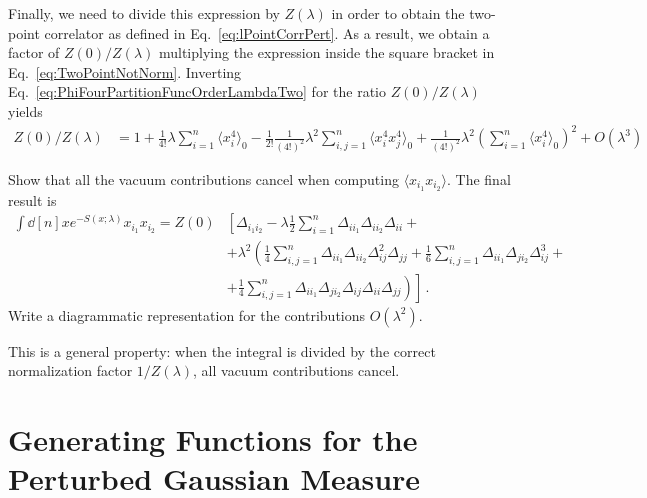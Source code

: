 \documentclass[notes.tex]{subfiles}
\begin{document}
Finally, we need to divide this expression by $Z(\lambda)$ in order to
obtain the two-point correlator as defined in
Eq.~\ref{eq:lPointCorrPert}.  As a result, we obtain a factor of
$Z(0)/Z(\lambda)$ multiplying the expression inside the square bracket
in Eq.~\ref{eq:TwoPointNotNorm}. Inverting
Eq.~\ref{eq:PhiFourPartitionFuncOrderLambdaTwo} for the ratio
$Z(0)/Z(\lambda)$ yields
\begin{align}
 Z(0)/Z(\lambda) &= 
                    1 + \frac{1}{4!} \lambda \sum_{i=1}^n \langle x_i^4\rangle_0 
                    - \frac{1}{2!} \frac{1}{(4!)^2} \lambda^2 \sum_{i,j=1}^n 
                    \langle x_i^4 x_j^4\rangle_0 
                   + \frac{1}{(4!)^2} \lambda^2 \left(\sum_{i=1}^n \langle x_i^4\rangle_0\right)^2
                   + O(\lambda^3) 
\end{align}

\begin{Ex}
  Show that all the vacuum contributions cancel when computing $\langle
  x_{i_1} x_{i_2}\rangle$. The final result is
  \begin{align}
  \int \dd[n]{x} e^{-S(x;\lambda)} 
  x_{i_1} x_{i_2} = Z(0) & 
                           \left[
                           \Delta_{i_1 i_2} - \lambda  \frac12 \sum_{i=1}^n
                           \Delta_{i i_1} \Delta_{i i_2} \Delta_{i i} 
                            + \right. \nonumber \\
                         & \left.
                           + \lambda^2 \left( 
                           \frac{1}{4} \sum_{i,j=1}^n \Delta_{i i_1}
                           \Delta_{i i_2} \Delta_{i j}^2 \Delta_{jj}
                           + \frac{1}{6} \sum_{i,j=1}^n \Delta_{i i_1}
                           \Delta_{j i_2} \Delta_{i j}^3 +
                           \right. \right. \nonumber \\
  \label{eq:TwoPointNorm}
                         & + \left. \left.
                           \frac{1}{4} \sum_{i,j=1}^n \Delta_{i i_1}
                           \Delta_{j i_2} \Delta_{i j} \Delta_{ii}\Delta_{jj}
                           \right)
                           \right]\, .
\end{align}
Write a diagrammatic representation for the contributions $O(\lambda^2)$.
\end{Ex}
This is a general property: when the integral is divided by the
correct normalization factor $1/Z(\lambda)$, all vacuum contributions
cancel.

\section{Generating Functions for the Perturbed Gaussian Measure}
\label{sec:gener-funct-pert}
\end{document}
